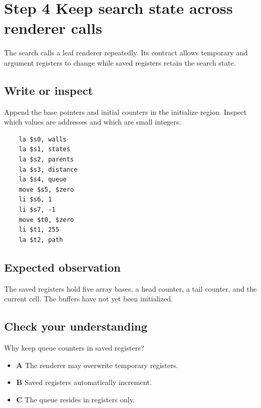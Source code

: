 \section{Step 4 Keep search state across renderer calls}\label{maze-s04}

The search calls a leaf renderer repeatedly. Its contract allows temporary and argument registers to change while saved registers retain the search state.

\subsection{Write or inspect}

Append the base pointers and initial counters in the initialize region. Inspect which values are addresses and which are small integers.

\begin{verbatim}
    la $s0, walls
    la $s1, states
    la $s2, parents
    la $s3, distance
    la $s4, queue
    move $s5, $zero
    li $s6, 1
    li $s7, -1
    move $t0, $zero
    li $t1, 255
    la $t2, path
\end{verbatim}

\subsection{Expected observation}

The saved registers hold five array bases, a head counter, a tail counter, and the current cell. The buffers have not yet been initialized.

\subsection{Check your understanding}

Why keep queue counters in saved registers?

\begin{itemize}
  \item \textbf{A} The renderer may overwrite temporary registers.
  \item \textbf{B} Saved registers automatically increment.
  \item \textbf{C} The queue resides in registers only.
\end{itemize}
